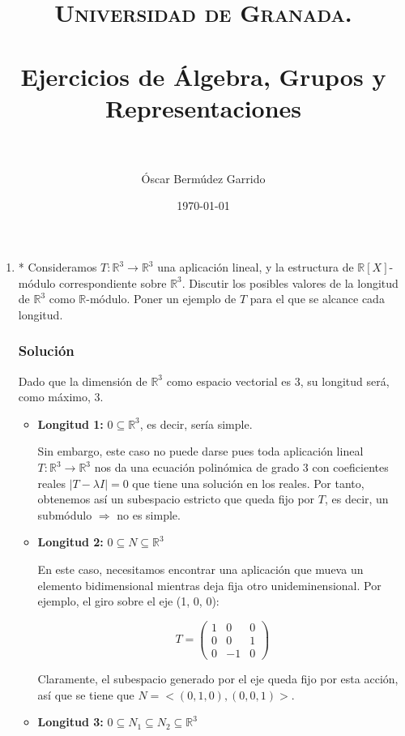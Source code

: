 \documentclass[paper=a4, fontsize=11pt, spanish]{scrartcl}
\title{
  \normalfont \normalsize 
  \textsc{Universidad de Granada.} \\ [25pt] %
  \horrule{0.5pt} \\[0.4cm] %
  \huge Ejercicios de Álgebra, Grupos y Representaciones \\ %
  \horrule{2pt} \\[0.5cm] %
}
\author{Óscar Bermúdez Garrido} %
\date{\normalsize\today} %
\begin{document}
	\maketitle %
	
	\newpage

	\begin{enumerate}
		\item * Consideramos $T: \mathbb{R}^3 \rightarrow \mathbb{R}^3$ una aplicación lineal, y la estructura
		de $\mathbb{R}[X]$-módulo correspondiente sobre $\mathbb{R}^3$. Discutir los posibles valores de la
		longitud de $\mathbb{R}^3$ como $\mathbb{R}$-módulo. Poner un ejemplo de $T$ para el que se alcance
		cada longitud.
		\subsubsection*{Solución}
		Dado que la dimensión de $\mathbb{R}^3$ como espacio vectorial es 3, su longitud será, como máximo, 3.
		
		\begin{itemize}
			\item \textbf{Longitud 1:} $0 \subseteq \mathbb{R}^3$, es decir, sería simple.
			
			Sin embargo, este caso no puede darse pues toda aplicación lineal $T: \mathbb{R}^3 \rightarrow
			\mathbb{R}^3$ nos da una ecuación polinómica de grado 3 con coeficientes reales $|T - \lambda I|
			= 0$ que tiene una solución en los reales. Por tanto, obtenemos así un subespacio estricto que
			queda fijo por $T$, es decir, un submódulo $\Rightarrow$ no es simple.
			
			\item \textbf{Longitud 2:} $0 \subseteq N \subseteq \mathbb{R}^3$
			
			En este caso, necesitamos encontrar una aplicación que mueva un elemento bidimensional mientras
			deja fija otro unideminensional. Por ejemplo, el giro sobre el eje (1, 0, 0):
			
			$$T = \begin{pmatrix}
				1 & 0 & 0 \\
				0 & 0 & 1 \\
				0 & -1 & 0
			\end{pmatrix}$$
			
			Claramente, el subespacio generado por el eje queda fijo por esta acción, así que se tiene que
			$N = <(0, 1, 0), (0, 0, 1)>$.
			
			\item \textbf{Longitud 3:} $0 \subseteq N_1 \subseteq N_2 \subseteq \mathbb{R}^3$
			

\end{itemize}
\end{enumerate}
\end{document}
